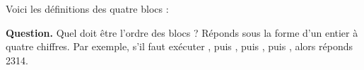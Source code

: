 \documentclass[class=report,crop=false, 12pt]{standalone}
\begin{document}
\begin{enigme}
\medskip
\bigskip
\bigskip

Voici les définitions des quatre blocs :
\begin{center}
\begin{scratch}
\end{scratch}\quad
\begin{scratch}
\end{scratch}\quad
\begin{scratch}
\end{scratch}\quad
\begin{scratch}
\end{scratch}
\end{center} 




\bigskip

\textbf{Question.} Quel doit être l'ordre des blocs ?
Réponds sous la forme d'un entier à quatre chiffres. Par exemple, s'il faut exécuter , puis
, puis , puis , alors réponds 2314.


\end{enigme}

\bigskip
\bigskip
\bigskip
\bigskip
\bigskip
\bigskip
\end{document}
